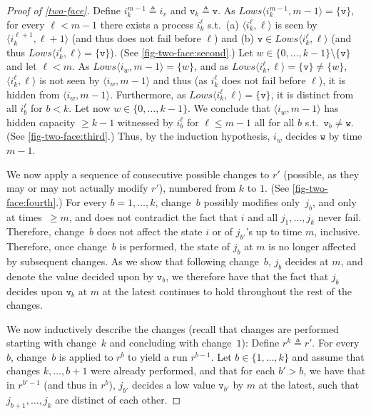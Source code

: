 \documentclass[11pt]{article}
\theoremstyle{definition}
\newcommand{\knownlows}[1]{\ensuremath{\mathit{Lows}\node{#1}}}
\newcommand{\eqdef}{\triangleq}
\newcommand{\set}[1]{\{#1\}}
\newcommand{\node}[1]{\langle#1\rangle}
\begin{document}
\begin{proof}[Proof of \cref{two-face}]
Define $i_k^{m-1}\eqdef i_v$ and $\mathtt{v}_k \eqdef \mathtt{v}$.
As $\knownlows{i_k^{m-1},m-1} = \set{\mathtt{v}}$, for every
$\ell<m-1$ there exists a process $i_k^{\ell}$ s.t.\ (a) $\node{i_k^{\ell},\ell}$ is seen
by $\node{i_k^{\ell+1},\ell+1}$ (and thus does not fail before $\ell$)
and (b) $\mathtt{v} \in \knownlows{i_k^{\ell},\ell}$ (and thus
$\knownlows{i_k^{\ell},\ell} = \set{\mathtt{v}}$). (See \cref{fig-two-face:second}.)
Let $w \in \set{0,\ldots,k-1} \setminus \set{\mathtt{v}}$ and let $\ell<m$.
As $\knownlows{i_w,m-1}=\set{w}$,
and as $\knownlows{i_k^{\ell},\ell}=\set{\mathtt{v}} \ne \set{w}$,
$\node{i_k^{\ell},\ell}$ is not seen by $\node{i_w,m-1}$
and thus (as $i_k^{\ell}$ does not fail before $\ell$), it is hidden from
$\node{i_w,m-1}$.
Furthermore, as $\knownlows{i_k^{\ell},\ell} = \set{\mathtt{v}}$, it is distinct
from all $i_{b}^{\ell}$ for $b<k$.
Let now $w \in \set{0,\ldots,k-1}$.
We conclude that $\node{i_w,m-1}$
has hidden capacity $\ge k-1$ witnessed by
$i_b^{\ell}$ for $\ell \le m-1$ all for all $b$ s.t.\ $\mathtt{v}_b \ne \mathtt{w}$. (See
\cref{fig-two-face:third}.)
Thus, by the induction hypothesis,
$i_w$ decides $\mathtt{w}$ by time $m-1$.

We now apply a sequence of consecutive possible
changes to $r'$ (possible, as they may or may not actually modify $r'$),
numbered from $k$ to $1$. (See \cref{fig-two-face:fourth}.)
For every $b=1,\ldots,k$,
change~$b$ possibly modifies only~$j_b$, and only at times~$\ge m$,
and does not contradict the fact that $i$ and all $j_1,\ldots,j_k$ never
fail.
Therefore, change~$b$ does not affect the state
$i$ or of $j_{b'}$'s up to time $m$, inclusive. Therefore, once change~$b$
is performed, the state of $j_b$ at $m$ is no longer affected by subsequent
changes.
As we show that following change~$b$, $j_b$ decides at $m$,
and denote the value decided upon by $\mathtt{v}_b$, we therefore have that
the fact that $j_b$
decides upon $\mathtt{v}_b$ at $m$ at the latest continues to hold throughout the
rest of the changes.

We now inductively describe the changes (recall that changes are performed starting
with change~$k$ and concluding with change~$1$):
Define $r^k\eqdef r'$. For every $b$, change~$b$ is applied to $r^b$
to yield a run $r^{b-1}$.
Let $b \in \set{1,\ldots,k}$ and assume that changes $k,\ldots,b+1$ were already
performed, and that for each $b'>b$, we have that in $r^{b'-1}$ (and thus
in $r^b$), $j_{b'}$ decides
a low value $\mathtt{v}_{b'}$ by $m$ at the latest, such that $j_{b+1},\ldots,j_k$ are
distinct of each other.


\end{proof}
\end{document}
